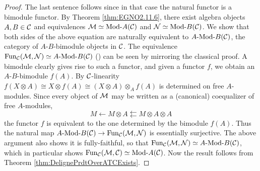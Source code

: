 \documentclass{amsart}
\begin{document}
\begin{proof}
	The last sentence follows since in that case the natural functor is a bimodule functor. By Theorem \ref{thm:EGNO2.11.6}, there exist algebra objects $A, B \in \mathcal C$ and equivalences $\cM \simeq \Mod{}{A}(\cC)$ and $\cN \simeq \Mod{}{B}(\cC)$. We show that both sides of the above equation are naturally equivalent to $\Mod{A}{B}(\cC)$, the category of $A$-$B$-bimodule objects in $\mathcal C$. The equivalence $\Fun_\cC(\cM, \cN) \simeq \Mod{A}{B}(\cC)$ (\cite[Prop 2.12.2]{EGNO}) can be seen by mirroring the classical proof. A bimodule clearly gives rise to such a functor, and given a functor $f$, we obtain an $A$-$B$-bimodule $f(A)$. By $\mathcal C$-linearity $f(X \otimes A) \cong X \otimes f(A)  \cong (X \otimes A) \otimes_A f(A) $ is determined on free $A$-modules. Since every object of $\mathcal M$ may be written as a (canonical) coequalizer of free $A$-modules,
	\begin{equation*}
		M \leftarrow M \otimes A \leftleftarrows M \otimes A \otimes A
	\end{equation*} 
the functor $f$ is equivalent to the one determined by the bimodule $f(A)$. Thus the natural map  $\Mod{A}{B}(\cC) \to \Fun_\cC(\cM, \cN)$ is essentially surjective. The above argument also shows it is fully-faithful, so that $\Fun_\cC(\cM, \cN) \simeq \Mod{A}{B}(\cC)$, which in particular shows $\Fun_\cC(\cM, \cC) \simeq \Mod{}{A}(\cC)$. Now the result follows from Theorem \ref{thm:DelignePrdtOverATCExists}.
\end{proof}
\end{document}

